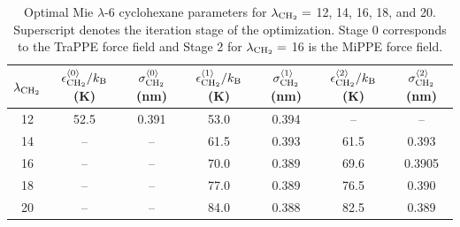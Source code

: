 \documentclass[journal=jced,manuscript=article]{achemso}
\begin{document}


    \begin{table}[h!]
		\caption{Optimal Mie $\lambda$-6 cyclohexane parameters for $\lambda_{\rm CH_2} =$ 12, 14, 16, 18, and 20. Superscript denotes the iteration stage of the optimization. Stage 0 corresponds to the TraPPE force field and Stage 2 for $\lambda_{\rm CH_2} =$ 16 is the MiPPE force field.} \label{tab:lam opt}
		\begin{center}
			\begin{tabular}{|c|c|c|c|c|c|c|}
				\hline
				$\lambda_{\rm CH_2}$ & $\epsilon_{\rm CH_2}^{\langle0\rangle}/k_{\rm B}$ (K) & $\sigma_{\rm CH_2}^{\langle0\rangle}$ (nm) & $\epsilon_{\rm CH_2}^{\langle1\rangle}/k_{\rm B}$ (K) & $\sigma_{\rm CH_2}^{\langle1\rangle}$ (nm) & $\epsilon_{\rm CH_2}^{\langle2\rangle}/k_{\rm B}$ (K) & $\sigma_{\rm CH_2}^{\langle2\rangle}$ (nm) \\ \hline
				12 & 52.5 & 0.391 & 53.0 & 0.394 & -- & -- \\ 
				14 & -- & -- & 61.5 & 0.393 & 61.5 & 0.393 \\ 
				16 & -- & -- & 70.0 & 0.389 & 69.6 & 0.3905 \\
				18 & -- & -- & 77.0 & 0.389 & 76.5 & 0.390 \\
				20 & -- & -- & 84.0 & 0.388 & 82.5 & 0.389 \\
				\hline
			\end{tabular}
		\end{center} 
	\end{table}
\end{document}
